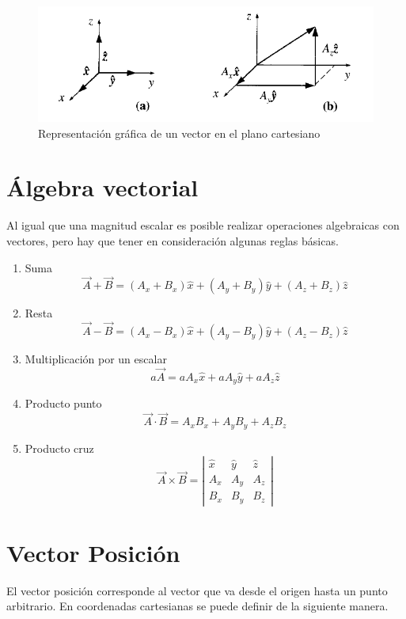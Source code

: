 \documentclass[12pt,letterpaper]{article}
\numberwithin{equation}{section}
\begin{document}
\begin{figure}[h!]
	\centering\includegraphics[scale=0.5]{Imagenes/Vectores.png}
	\caption{Representación gráfica de un vector en el plano cartesiano}
	\label{Fig:Vectores}
\end{figure}

\section*{Álgebra vectorial}
Al igual que una magnitud escalar es posible realizar operaciones algebraicas con vectores, pero hay que tener en consideración algunas reglas básicas. 

\begin{enumerate}
	\item Suma
	$$\vec{A}+\vec{B}=(A_x+B_x)\hat{x}+(A_y+B_y)\hat{y}+(A_z+B_z)\hat{z}$$
	
	\item Resta
	$$\vec{A}-\vec{B}=(A_x-B_x)\hat{x}+(A_y-B_y)\hat{y}+(A_z-B_z)\hat{z}$$
	
	\item Multiplicación por un escalar
	$$a\vec{A}=aA_x\hat{x}+aA_y\hat{y}+aA_z\hat{z}$$
	
	\item Producto punto
	$$\vec{A}\cdot\vec{B}=A_xB_x+A_yB_y+A_zB_z$$
	
	\item Producto cruz
	$$\vec{A}\times\vec{B}=\left | \begin{array}{ccc}
	\hat{x} & \hat{y} & \hat{z}\\
	A_x & A_y & A_z\\
	B_x & B_y & B_z  \end{array} \right |$$
	
\end{enumerate}

\section*{Vector Posición}
El vector posición corresponde al vector que va desde el origen hasta un punto arbitrario. En coordenadas cartesianas se puede definir de la siguiente manera.
\end{document}
